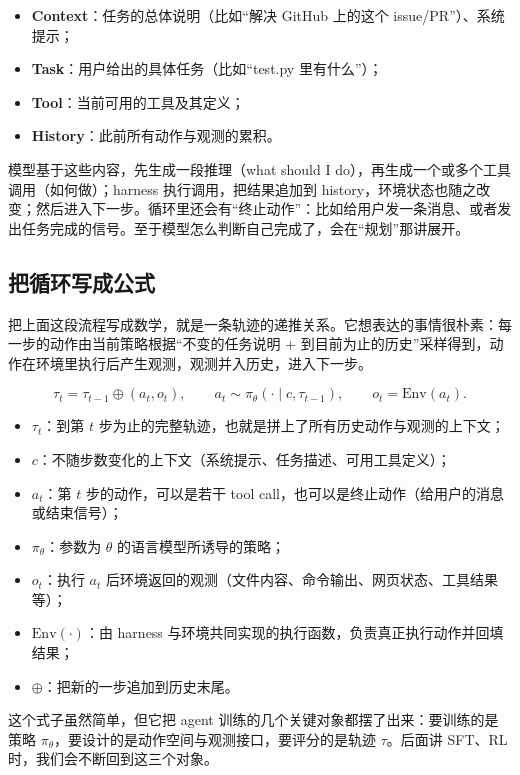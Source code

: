 \documentclass[a4paper]{article}
\begin{document}
\begin{itemize}
\item \textbf{Context}：任务的总体说明（比如“解决 GitHub 上的这个 issue/PR”）、系统提示；
\item \textbf{Task}：用户给出的具体任务（比如“test.py 里有什么”）；
\item \textbf{Tool}：当前可用的工具及其定义；
\item \textbf{History}：此前所有动作与观测的累积。
\end{itemize}

模型基于这些内容，先生成一段推理（what should I do），再生成一个或多个工具调用（如何做）；harness 执行调用，把结果追加到 history，环境状态也随之改变；然后进入下一步。循环里还会有“终止动作”：比如给用户发一条消息、或者发出任务完成的信号。至于模型怎么判断自己完成了，会在“规划”那讲展开。

\subsection{把循环写成公式}

把上面这段流程写成数学，就是一条轨迹的递推关系。它想表达的事情很朴素：每一步的动作由当前策略根据“不变的任务说明 + 到目前为止的历史”采样得到，动作在环境里执行后产生观测，观测并入历史，进入下一步。

$$
\tau_t = \tau_{t-1} \oplus (a_t, o_t), \qquad
a_t \sim \pi_\theta(\cdot \mid c, \tau_{t-1}), \qquad
o_t = \mathrm{Env}(a_t).
$$

\begin{itemize}
\item $\tau_t$：到第 $t$ 步为止的完整轨迹，也就是拼上了所有历史动作与观测的上下文；
\item $c$：不随步数变化的上下文（系统提示、任务描述、可用工具定义）；
\item $a_t$：第 $t$ 步的动作，可以是若干 tool call，也可以是终止动作（给用户的消息或结束信号）；
\item $\pi_\theta$：参数为 $\theta$ 的语言模型所诱导的策略；
\item $o_t$：执行 $a_t$ 后环境返回的观测（文件内容、命令输出、网页状态、工具结果等）；
\item $\mathrm{Env}(\cdot)$：由 harness 与环境共同实现的执行函数，负责真正执行动作并回填结果；
\item $\oplus$：把新的一步追加到历史末尾。
\end{itemize}

这个式子虽然简单，但它把 agent 训练的几个关键对象都摆了出来：要训练的是策略 $\pi_\theta$，要设计的是动作空间与观测接口，要评分的是轨迹 $\tau$。后面讲 SFT、RL 时，我们会不断回到这三个对象。
\end{document}
